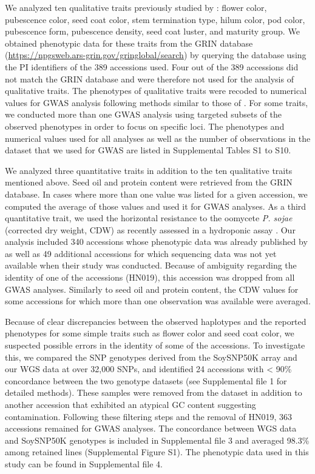 \documentclass{article}
\begin{document}
We analyzed ten qualitative traits previously studied by : flower
color, pubescence color, seed coat color, stem termination type, hilum color,
pod color, pubescence form, pubescence density, seed coat luster, and maturity
group.  We obtained phenotypic data for these traits from the GRIN database
(\url{https://npgsweb.ars-grin.gov/gringlobal/search}) by querying the database
using the PI identifiers of the 389 accessions used.  Four out of the 389
accessions did not match the GRIN database and were therefore not used for the
analysis of qualitative traits. The phenotypes of qualitative traits were recoded
to numerical values for GWAS analysis following methods similar to those of
.  For some traits, we conducted more than one GWAS analysis
using targeted subsets of the observed phenotypes in order to focus on specific
loci. The phenotypes and numerical values used for all analyses as well as the
number of observations in the dataset that we used for GWAS are listed in
Supplemental Tables S1 to S10.

We analyzed three quantitative traits in addition to the ten qualitative traits
mentioned above. Seed oil and protein content were retrieved from the GRIN
database. In cases where more than one value was listed for a given accession,
we computed the average of those values and used it for GWAS analyses. As a third quantitative trait, we
used the horizontal resistance to the oomycete \textit{P. sojae} (corrected dry
weight, CDW) as recently assessed in a hydroponic assay .
Our analysis included 340 accessions whose phenotypic data
was already published by  as well as 49 additional accessions for
which sequencing data was not yet available when their study was conducted.
Because of ambiguity regarding the identity of one of the accessions (HN019), this accession
was dropped from all GWAS analyses. Similarly to seed oil and
protein content, the CDW values for some accessions for which more than one
observation was available were averaged.

Because of clear discrepancies between the observed haplotypes and the reported
phenotypes for some simple traits such as flower color and seed coat color, we
suspected possible errors in the identity of some of the accessions. To
investigate this, we compared the SNP genotypes derived from the SoySNP50K
array and our WGS data at over 32,000 SNPs, and identified 24 accessions with <
90\% concordance between the two genotype datasets (see Supplemental file 1 for
detailed methods). These samples were removed from the dataset in addition to another
accession that exhibited an atypical GC content suggesting contamination.
Following these filtering steps and the removal of HN019, 363 accessions
remained for GWAS analyses. The concordance between WGS data and SoySNP50K
genotypes is included in Supplemental file 3 and averaged 98.3\% among retained
lines (Supplemental Figure S1). The phenotypic data used in this study can be found in Supplemental file 4.
\end{document}
